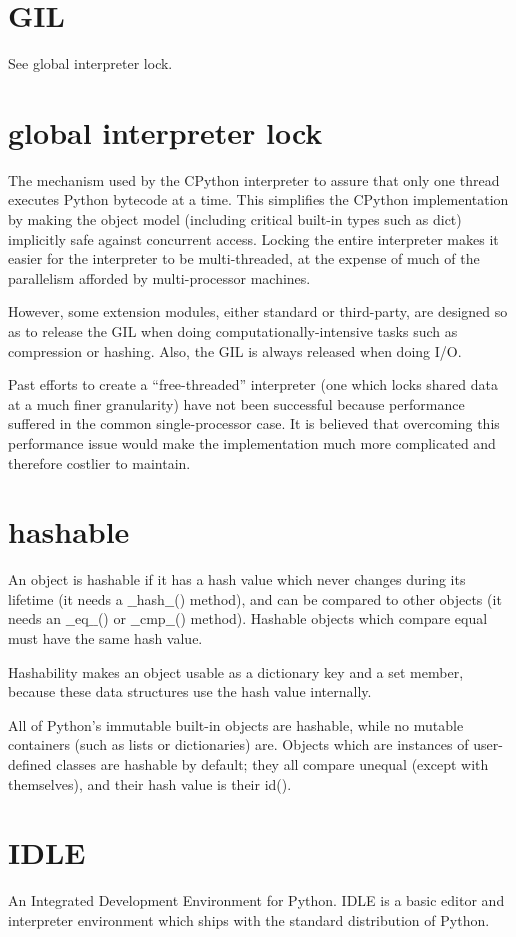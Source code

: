 \documentclass[12pt,a4paper,final,twoside,onecolumn,titlepage]{book}
\begin{document}
\section{GIL}
See global interpreter lock.

\section{global interpreter lock}
The mechanism used by the CPython interpreter to assure that only one thread executes Python bytecode at a time. This simplifies the CPython implementation by making the object model (including critical built-in types such as dict) implicitly safe against concurrent access. Locking the entire interpreter makes it easier for the interpreter to be multi-threaded, at the expense of much of the parallelism afforded by multi-processor machines.

However, some extension modules, either standard or third-party, are designed so as to release the GIL when doing computationally-intensive tasks such as compression or hashing. Also, the GIL is always released when doing I/O.

Past efforts to create a “free-threaded” interpreter (one which locks shared data at a much finer granularity) have not been successful because performance suffered in the common single-processor case. It is believed that overcoming this performance issue would make the implementation much more complicated and therefore costlier to maintain.

\section{hashable}
An object is hashable if it has a hash value which never changes during its lifetime (it needs a $\_\_$hash$\_\_$() method), and can be compared to other objects (it needs an $\_\_$eq$\_\_$() or $\_\_$cmp$\_\_$() method). Hashable objects which compare equal must have the same hash value.

Hashability makes an object usable as a dictionary key and a set member, because these data structures use the hash value internally.

All of Python’s immutable built-in objects are hashable, while no mutable containers (such as lists or dictionaries) are. Objects which are instances of user-defined classes are hashable by default; they all compare unequal (except with themselves), and their hash value is their id().

\section{IDLE}
An Integrated Development Environment for Python. IDLE is a basic editor and interpreter environment which ships with the standard distribution of Python.
\end{document}
